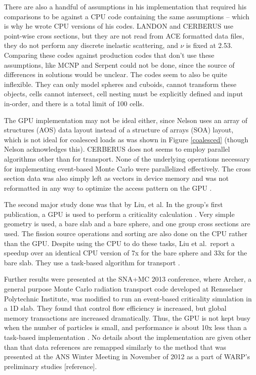 There are also a handful of assumptions in his implementation that required his comparisons to be against a CPU code containing the same assumptions -- which is why he wrote CPU versions of his codes.  LANDON and CERBERUS use point-wise cross sections, but they are not read from ACE formatted data files, they do not perform any discrete inelastic scattering, and $\nu$ is fixed at 2.53.  Comparing these codes against production codes that don't use these assumptions, like MCNP and Serpent could not be done, since the source of differences in solutions would be unclear.  The codes seem to also be quite inflexible.  They can only model spheres and cuboids, cannot transform these objects, cells cannot intersect, cell nesting must be explicitly defined and input in-order, and there is a total limit of 100 cells.

The GPU implementation may not be ideal either, since Nelson uses an array of structures (AOS) data layout instead of a structure of arrays (SOA) layout, which is not ideal for coalesced loads as was shown in Figure \ref{coalesced} (though Nelson acknowledges this).  CERBERUS does not seems to employ parallel algorithms other than for transport.  None of the underlying operations necessary for implementing event-based Monte Carlo were parallelized effectively.  The cross section data was also simply left as vectors in device memory and was not reformatted in any way to optimize the access pattern on the GPU \cite{nelson}.

The second major study done was that by Liu, et al.  In the group's first publication, a GPU is used to perform a criticality calculation \cite{tianyu}.  Very simple geometry is used, a bare slab and a bare sphere, and one group cross sections are used.  The fission source operations and sorting are also done on the CPU rather than the GPU.  Despite using the CPU to do these tasks, Liu et al.\ report a speedup over an identical CPU version of 7x for the bare sphere and 33x for the bare slab. They use a task-based algorithm for transport \cite{tianyu}.  

Further results were presented at the SNA+MC 2013 conference, where Archer, a general purpose Monte Carlo radiation transport code developed at Rensselaer Polytechnic Institute, was modified to run an event-based criticality simulation in a 1D slab.  They found that control flow efficiency is increased, but global memory transactions are increased dramatically. Thus, the GPU is not kept busy when the number of particles is small, and performance is about 10x less than a task-based implementation \cite{tianyu_snamc}.  No details about the implementation are given other than that data references are remapped similarly to the method that was presented at the ANS Winter Meeting in November of 2012 as a part of WARP's preliminary studies [reference].  %

